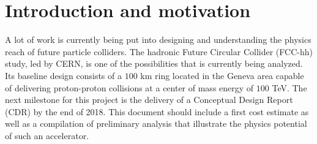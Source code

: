 
\section{Introduction and motivation}
\label{sec:intro}


A lot of work is currently being put into designing and understanding the physics reach of future particle colliders. The hadronic Future Circular Collider (FCC-hh) study, led by CERN, is one of the possibilities that is currently being analyzed. Its baseline design consists of a $100$ km ring located in the Geneva area capable of delivering proton-proton collisions at a center of mass energy of $100$ TeV. The next milestone for this project is the delivery of a Conceptual Design Report (CDR) by the end of 2018. This document should include a first cost estimate as well as a compilation of preliminary analysis that illustrate the physics potential of such an accelerator.

